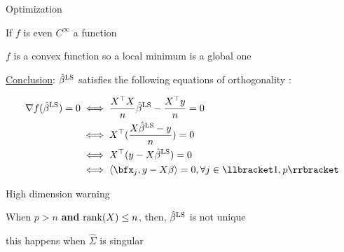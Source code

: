 \documentclass[unknownkeysallowed]{beamer}
\begin{document}
\begin{frame}{Optimization}

\vspace{0.2cm}

\rem If $f$ is even $C^{\infty}$ a function

\vspace{0.2cm}

\rem $f$ is a convex function so a local minimum is a global one

\vspace{0.2cm}

\underline{Conclusion}:
$\hat\beta^{\rm LS}$ satisfies the following equations of orthogonality :

\begin{align*}
	\nabla{f(\hat\beta^{\rm LS})} = 0
	& \iff\frac{X^{\top}X}{n}\hat\beta^{\rm LS}-\frac{X^{\top}y}{n}=0\\
	& \iff X^{\top}(\frac{X\hat\beta^{\rm LS}-y}{n})=0\\
	& \iff X^{\top}(y-X\hat\beta^{\rm LS})=0\\
	& \iff \langle \bfx_{j},y-X\beta\rangle=0, \forall j \in \llbracket 1,p\rrbracket\\
\end{align*}
\end{frame}


\begin{frame}{High dimension warning} %


\danger When $p  > n$ \textbf{and}  ${\rm rank}(X) \leq n $, then, $\hat{\beta}^{\rm LS}$ is not unique

\vspace{1cm}

\rem this happens when $\hat\Sigma$ is singular

\end{frame}
\end{document}
